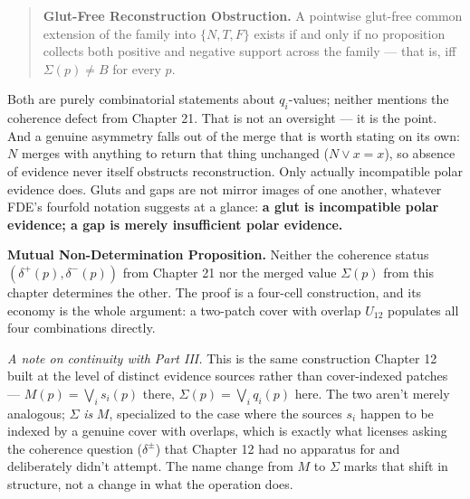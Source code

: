\begin{quote}
\textbf{Glut-Free Reconstruction Obstruction.} A pointwise glut-free common
extension of the family into \(\{N,T,F\}\) exists if and only if no
proposition collects both positive and negative support across the
family --- that is, iff \(\Sigma(p) \neq B\) for every \(p\).
\end{quote}

Both are purely combinatorial statements about \(q_i\)-values; neither
mentions the coherence defect from Chapter 21. That is not an oversight ---
it is the point. And a genuine asymmetry falls out of the merge that is
worth stating on its own: \(N\) merges with anything to return that thing
unchanged (\(N \vee x = x\)), so absence of evidence never itself obstructs
reconstruction. Only actually incompatible polar evidence does. Gluts and
gaps are not mirror images of one another, whatever FDE's fourfold
notation suggests at a glance: \textbf{a glut is incompatible polar evidence; a
gap is merely insufficient polar evidence.}

\textbf{Mutual Non-Determination Proposition.} Neither the coherence status
\((\delta^+(p), \delta^-(p))\) from Chapter 21 nor the merged value
\(\Sigma(p)\) from this chapter determines the other. The proof is a
four-cell construction, and its economy is the whole argument: a
two-patch cover with overlap \(U_{12}\) populates all four combinations
directly.

\emph{A note on continuity with Part III.} This is the same construction
Chapter 12 built at the level of distinct evidence sources rather than
cover-indexed patches --- \(M(p) = \bigvee_i s_i(p)\) there, \(\Sigma(p) = \bigvee_i q_i(p)\) here. The two aren't merely analogous; \(\Sigma\) \emph{is}
\(M\), specialized to the case where the sources \(s_i\) happen to be
indexed by a genuine cover with overlaps, which is exactly what licenses
asking the coherence question (\(\delta^\pm\)) that Chapter 12 had no
apparatus for and deliberately didn't attempt. The name change from \(M\)
to \(\Sigma\) marks that shift in structure, not a change in what the
operation does.

